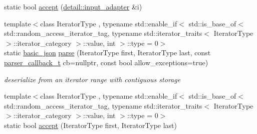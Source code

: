 \begin{DoxyCompactItemize}
\item 
static bool \hyperlink{classnlohmann_1_1basic__json_a2c3a529fba80aa83557246b910181388}{accept} (\hyperlink{classnlohmann_1_1detail_1_1input__adapter}{detail\+::input\+\_\+adapter} \&i)
\item 
{\footnotesize template$<$class Iterator\+Type , typename std\+::enable\+\_\+if$<$ std\+::is\+\_\+base\+\_\+of$<$ std\+::random\+\_\+access\+\_\+iterator\+\_\+tag, typename std\+::iterator\+\_\+traits$<$ Iterator\+Type $>$\+::iterator\+\_\+category $>$\+::value, int $>$\+::type  = 0$>$ }\\static \hyperlink{classnlohmann_1_1basic__json}{basic\+\_\+json} \hyperlink{classnlohmann_1_1basic__json_ab330c13ba254ea41fbc1c52c5c610f45}{parse} (Iterator\+Type first, Iterator\+Type last, const \hyperlink{classnlohmann_1_1basic__json_ab4f78c5f9fd25172eeec84482e03f5b7}{parser\+\_\+callback\+\_\+t} cb=nullptr, const bool allow\+\_\+exceptions=true)
\begin{DoxyCompactList}\small\item\em deserialize from an iterator range with contiguous storage \end{DoxyCompactList}\item 
{\footnotesize template$<$class Iterator\+Type , typename std\+::enable\+\_\+if$<$ std\+::is\+\_\+base\+\_\+of$<$ std\+::random\+\_\+access\+\_\+iterator\+\_\+tag, typename std\+::iterator\+\_\+traits$<$ Iterator\+Type $>$\+::iterator\+\_\+category $>$\+::value, int $>$\+::type  = 0$>$ }\\static bool \hyperlink{classnlohmann_1_1basic__json_ae797958b922732bf5fc01053d0659c1f}{accept} (Iterator\+Type first, Iterator\+Type last)
\end{DoxyCompactItemize}
